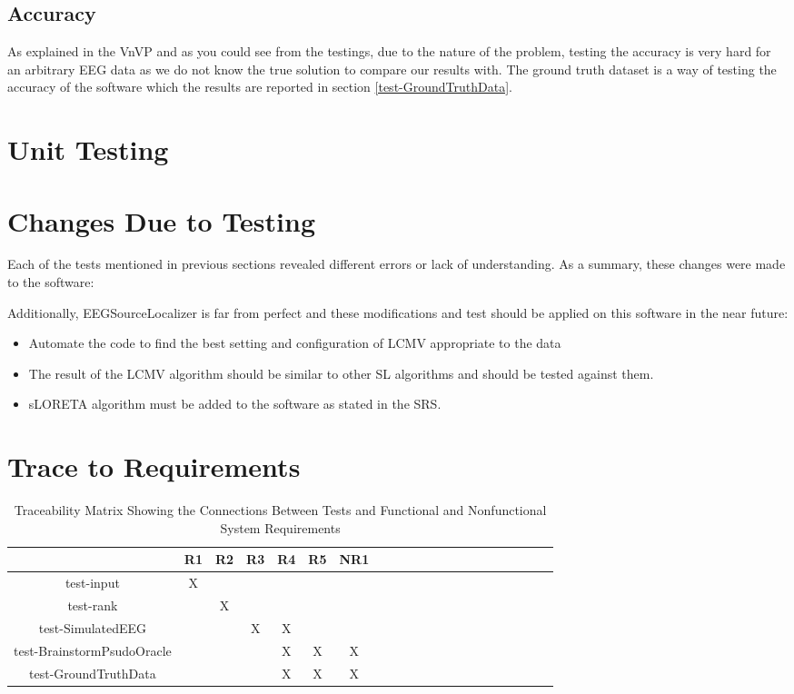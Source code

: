 \documentclass[12pt, titlepage]{article}
\renewcommand{\progname}{EEGSourceLocalizer}
\begin{document}
\subsection{Accuracy}

As explained in the VnVP and as you could see from the testings, due to the nature of the problem, testing the accuracy is very hard for an arbitrary EEG data as we do not know the true solution to compare our results with. The ground truth dataset is a way of testing the accuracy of the software which the results are reported in section \ref{test-GroundTruthData}.
\section{Unit Testing}

\section{Changes Due to Testing}

Each of the tests mentioned in previous sections revealed different errors or lack of understanding. As a summary, these changes were made to the software:

Additionally, \progname{} is far from perfect and these modifications and test should be applied on this software in the near future:

\begin{itemize}
\item Automate the code to find the best setting and configuration of LCMV appropriate to the data
\item The result of the LCMV algorithm should be similar to other SL algorithms and should be tested against them.
\item sLORETA algorithm must be added to the software as stated in the SRS.
\end{itemize}


\section{Trace to Requirements}

\begin{table}[h!]
	\centering
	\begin{tabular}{|c|c|c|c|c|c|c|c|c|c|c|c|c|c|c|c|c|c|c|c|c|}
		\hline        
		& R1 & R2 & R3 & R4 & R5 & NR1 \\
		\hline
		test-input        &X & & & & & \\ \hline
		test-rank        & &X & & & &  \\ \hline
		test-SimulatedEEG        & & &X & X& & \\ \hline
		test-BrainstormPsudoOracle        & & & &X & X& X \\ \hline
		test-GroundTruthData   & & & &X & X& X \\ \hline
	\end{tabular}
\caption{Traceability Matrix Showing the Connections Between Tests and Functional and Nonfunctional System Requirements}
\label{Table:A_trace}
\end{table}
\end{document}
